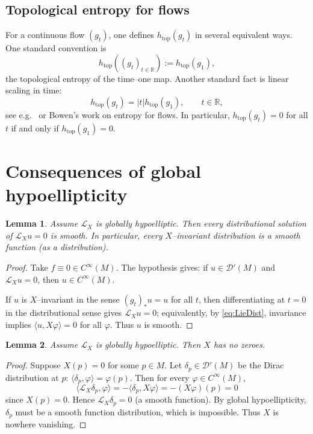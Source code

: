 \documentclass[11pt]{article}
\newtheorem{lemma}{Lemma}
\theoremstyle{definition}
\theoremstyle{remark}
\newcommand{\Dist}{\mathcal{D}'}
\newcommand{\Lie}{\mathcal{L}}
\newcommand{\htop}{h_{\mathrm{top}}}
\begin{document}
\subsection{Topological entropy for flows}

For a continuous flow $(g_t)$, one defines $\htop(g_t)$ in several equivalent ways. One standard convention is
\[
\htop((g_t)_{t\in\mathbb{R}}):=\htop(g_1),
\]
the topological entropy of the time--one map. Another standard fact is linear scaling in time:
\[
\htop(g_t)=|t|\htop(g_1),\qquad t\in\mathbb{R},
\]
see e.g.\ \cite[Theorem 7.2]{Walters} or Bowen's work on entropy for flows.
In particular, $\htop(g_t)=0$ for all $t$ if and only if $\htop(g_1)=0$.

\section{Consequences of global hypoellipticity}

\begin{lemma}\label{lem:kernelSmooth}
Assume $\Lie_X$ is globally hypoelliptic. Then every distributional solution of $\Lie_X u=0$ is smooth. In particular,
every $X$--invariant distribution is a smooth function (as a distribution).
\end{lemma}

\begin{proof}
Take $f\equiv 0\in C^\infty(M)$. The hypothesis gives:
if $u\in\Dist(M)$ and $\Lie_X u=0$, then $u\in C^\infty(M)$.

If $u$ is $X$--invariant in the sense $(g_t)_*u=u$ for all $t$, then differentiating at $t=0$ in the distributional sense
gives $\Lie_X u=0$; equivalently, by \eqref{eq:LieDist}, invariance implies $\langle u, X\varphi\rangle=0$ for all $\varphi$.
Thus $u$ is smooth.
\end{proof}

\begin{lemma}\label{lem:noZeros}
Assume $\Lie_X$ is globally hypoelliptic. Then $X$ has no zeroes.
\end{lemma}

\begin{proof}
Suppose $X(p)=0$ for some $p\in M$.
Let $\delta_p\in\Dist(M)$ be the Dirac distribution at $p$: $\langle \delta_p,\varphi\rangle=\varphi(p)$.
Then for every $\varphi\in C^\infty(M)$,
\[
\langle \Lie_X \delta_p,\varphi\rangle = -\langle \delta_p, X\varphi\rangle = -(X\varphi)(p)=0
\]
since $X(p)=0$. Hence $\Lie_X\delta_p=0$ (a smooth function).
By global hypoellipticity, $\delta_p$ must be a smooth function distribution, which is impossible.
Thus $X$ is nowhere vanishing.
\end{proof}
\end{document}
